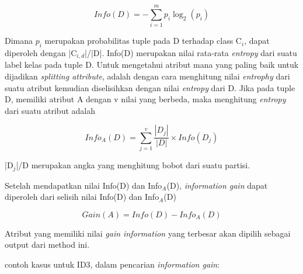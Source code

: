 \begin{displaymath}
	Info(D) = -\sum_{i=1}^{m} p_{i} \log_2(p_{i})
\end{displaymath}

Dimana $p_{i}$ merupakan probabilitas tuple pada D terhadap class C$_{i}$, dapat diperoleh dengan |C$_{i,d}$|/|D|. Info(D) merupakan nilai rata-rata \textsl{entropy} dari suatu label kelas pada tuple D. Untuk mengetahui atribut mana yang paling baik untuk dijadikan \textsl{splitting attribute}, adalah dengan cara menghitung nilai \textsl{entrophy} dari suatu atribut kemudian diselisihkan dengan nilai \textsl{entropy} dari D. Jika pada tuple D, memiliki atribut A dengan v nilai yang berbeda, maka menghitung \textsl{entropy} dari suatu atribut adalah

\begin{displaymath}
	Info_A(D) = \sum_{j=1}^v \frac{|D_j|}{|D|} \times Info(D_j)
\end{displaymath}

|D$_{j}$|/D merupakan angka yang menghitung bobot dari suatu partisi.

Setelah mendapatkan nilai Info(D) dan Info$_{A}$(D), \textsl{information gain} dapat diperoleh dari selisih nilai Info(D) dan Info$_{A}$(D)

\begin{displaymath}
	Gain(A) = Info(D) - Info_A(D)
\end{displaymath}

Atribut yang memiliki nilai \textsl{gain information} yang terbesar akan dipilih sebagai output dari method ini.

contoh kasus untuk ID3, dalam pencarian \textsl{information gain}:

